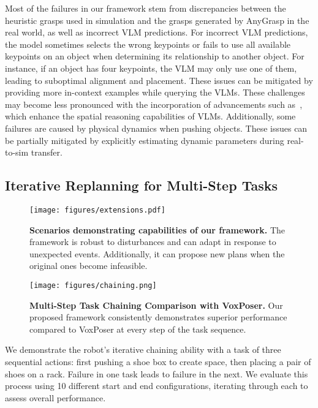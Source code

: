 Most of the failures in our framework stem from discrepancies between the heuristic grasps used in simulation and the grasps generated by AnyGrasp in the real world, as well as incorrect VLM predictions. For incorrect VLM predictions, the model sometimes selects the wrong keypoints or fails to use all available keypoints on an object when determining its relationship to another object. For instance, if an object has four keypoints, the VLM may only use one of them, leading to suboptimal alignment and placement. These issues can be mitigated by providing more in-context examples while querying the VLMs.
These challenges may become less pronounced with the incorporation of advancements such as~\cite{chen2024spatialvlm}, which enhance the spatial reasoning capabilities of VLMs. Additionally, some failures are caused by physical dynamics when pushing objects. These issues can be partially mitigated by explicitly estimating dynamic parameters during real-to-sim transfer.



\subsection{Iterative Replanning for Multi-Step Tasks}

\begin{figure*}[t]
    \centering
    \texttt{[image: figures/extensions.pdf]}
    \caption{\small{\textbf{Scenarios demonstrating capabilities of our framework.} The framework is robust to disturbances and can adapt in response to unexpected events. Additionally, it can propose new plans when the original ones become infeasible.}}
    \label{fig:extensions}
    \vspace{-1.6em}
\end{figure*}


\begin{figure}[h]
    \setlength{\abovecaptionskip}{0pt}
    \texttt{[image: figures/chaining.png]}
    \caption{\small{\textbf{Multi-Step Task Chaining Comparison with VoxPoser.} Our proposed framework consistently demonstrates superior performance compared to VoxPoser at every step of the task sequence.}}
    \label{fig:chaining_analysis}
    \vspace{-2.1em}
\end{figure}





We demonstrate the robot's iterative chaining ability with a task of three sequential actions: first pushing a shoe box to create space, then placing a pair of shoes on a rack. Failure in one task leads to failure in the next. We evaluate this process using 10 different start and end configurations, iterating through each to assess overall performance.

